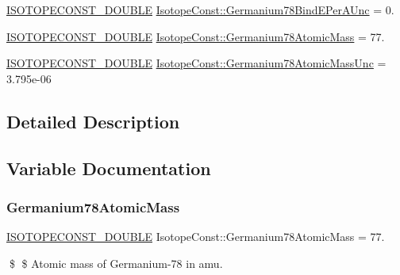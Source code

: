 \begin{DoxyCompactItemize}
\mbox{\hyperlink{group___isotope_const-_macros_ga8f45a7272ce02c0b4c65c44636ed719a}{I\+S\+O\+T\+O\+P\+E\+C\+O\+N\+S\+T\+\_\+\+D\+O\+U\+B\+LE}} \mbox{\hyperlink{group___isotope_const-_germanium-_ge78_ga9b0e324090043717c64264d501b0acd5}{Isotope\+Const\+::\+Germanium78\+Bind\+E\+Per\+A\+Unc}} = 0.
\item 
\mbox{\hyperlink{group___isotope_const-_macros_ga8f45a7272ce02c0b4c65c44636ed719a}{I\+S\+O\+T\+O\+P\+E\+C\+O\+N\+S\+T\+\_\+\+D\+O\+U\+B\+LE}} \mbox{\hyperlink{group___isotope_const-_germanium-_ge78_ga74aeac6bcd7ebfaf2f232e31156790cc}{Isotope\+Const\+::\+Germanium78\+Atomic\+Mass}} = 77.
\item 
\mbox{\hyperlink{group___isotope_const-_macros_ga8f45a7272ce02c0b4c65c44636ed719a}{I\+S\+O\+T\+O\+P\+E\+C\+O\+N\+S\+T\+\_\+\+D\+O\+U\+B\+LE}} \mbox{\hyperlink{group___isotope_const-_germanium-_ge78_ga6a4e276f712ffb69ee0f78971130d78a}{Isotope\+Const\+::\+Germanium78\+Atomic\+Mass\+Unc}} = 3.\+795e-\/06
\end{DoxyCompactItemize}


\subsection{Detailed Description}


\subsection{Variable Documentation}
\mbox{\label{group___isotope_const-_germanium-_ge78_ga74aeac6bcd7ebfaf2f232e31156790cc}} 
\subsubsection{\texorpdfstring{Germanium78\+Atomic\+Mass}{Germanium78AtomicMass}}
{\footnotesize\ttfamily \mbox{\hyperlink{group___isotope_const-_macros_ga8f45a7272ce02c0b4c65c44636ed719a}{I\+S\+O\+T\+O\+P\+E\+C\+O\+N\+S\+T\+\_\+\+D\+O\+U\+B\+LE}} Isotope\+Const\+::\+Germanium78\+Atomic\+Mass = 77.}

\$ \$ Atomic mass of Germanium-\/78 in amu. \mbox{\label{group___isotope_const-_germanium-_ge78_ga6a4e276f712ffb69ee0f78971130d78a}} 
